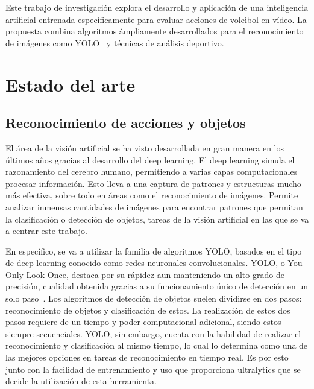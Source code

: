 \documentclass[12pt]{report} %
\begin{document}
    Este trabajo de investigación explora el desarrollo y aplicación de una
    inteligencia artificial entrenada específicamente para evaluar acciones de
    voleibol en vídeo. La propuesta combina algoritmos ámpliamente
    desarrollados para el reconocimiento de imágenes como YOLO~\cite{YOLO} y
    técnicas de análisis deportivo.

 

    \chapter{Estado del arte}
    \label{chap:estadoarte}

    \section{Reconocimiento de acciones y objetos}
    El área de la visión artificial se ha visto desarrollada en gran manera en
    los últimos años gracias al desarrollo del deep learning. El deep learning
    simula el razonamiento del cerebro humano, permitiendo a varias capas
    computacionales procesar información. Esto lleva a una captura de patrones
    y estructuras mucho más efectiva, sobre todo en áreas como el
    reconocimiento de imágenes. Permite analizar inmensas cantidades de
    imágenes para encontrar patrones que permitan la clasificación o detección
    de objetos, tareas de la visión artificial en las que se va a centrar este
    trabajo. ~\cite{VOULODIMOS2018} 
    
    En específico, se va a utilizar la familia de algoritmos YOLO,
    basados en el tipo de deep learning conocido como redes neuronales
    convolucionales. YOLO, o You Only Look Once, destaca por su rápidez aun
    manteniendo un alto grado de precisión, cualidad obtenida gracias a su
    funcionamiento único de detección en un solo paso~\cite{JIANG20221066}. Los algoritmos de
    detección de objetos suelen dividirse en dos pasos: reconocimiento de
    objetos y clasificación de estos. La realización de estos dos pasos
    requiere de un tiempo y poder computacional adicional, siendo estos siempre
    secuenciales. YOLO, sin embargo, cuenta con la habilidad de realizar el
    reconocimiento y clasificación al mismo tiempo, lo cual lo determina como
    una de las mejores opciones en tareas de reconocimiento en tiempo real. Es
    por esto junto con la facilidad de entrenamiento y uso que proporciona
    ultralytics que se decide la utilización de esta herramienta.
\end{document}
